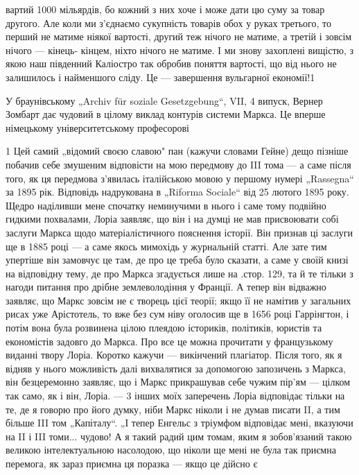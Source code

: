 \parcont{}  %
вартий 1000 мільярдів, бо кожний з них хоче і може дати цю суму за товар другого. Але коли ми з'єднаємо сукупність товарів
обох у руках третього, то перший не матиме ніякої вартості, другий теж нічого не матиме, а третій і зовсім нічого — кінець-
кінцем, ніхто нічого не матиме. І ми знову захоплені вищістю, з якою наш південний Каліостро так обробив поняття вартості,
що від нього не залишилось і найменшого сліду. Це — завершення вульгарної економії!1

У браунівському „Archiv für soziale Gesetzgebung“, VII, 4 випуск, Вернер Зомбарт дає чудовий в цілому виклад контурів
системи Маркса. Це вперше німецькому університетському професорові

1 Цей самий „відомий своєю славою" пан (кажучи словами Гейне) дещо пізніше побачив себе змушеним відповісти на мою передмову
до III тома — а саме після того, як ця передмова з’явилась італійською мовою у першому нумері „Rassegna“ за 1895 рік.
Відповідь надрукована в „Riforma Sociale“ від 25 лютого 1895 року. Щедро наділивши мене спочатку неминучими в нього і саме
тому подвійно гидкими похвалами, Лоріа заявляє, що він і на думці не мав присвоювати собі заслуги Маркса щодо
матеріалістичного пояснення історії. Він признав ці заслуги ще в 1885 році — а саме якось мимохідь у журнальній статті. Але
зате тим упертіше він замовчує це там, де про це треба було сказати, а саме у своїй книзі на відповідну тему, де про Маркса
згадується лише на .стор. 129, та й те тільки з нагоди питання про дрібне землеволодіння у Франції. А тепер він відважно
заявляє, що Маркс зовсім не є творець цієї теорії; якщо її не намітив у загальних рисах уже Арістотель, то вже без сум ніву
оголосив ще в 1656 році Гаррінгтон, і потім вона була розвинена цілою плеядою істориків, політиків, юристів та економістів
задовго до Маркса. Про все це можна прочитати у французькому виданні твору Лоріа. Коротко кажучи — викінчений плагіатор.
Після того, як я відняв у нього можливість далі вихвалятися за допомогою запозичень з Маркса, він безцеремонно заявляє, що і
Маркс прикрашував себе чужим пір’ям — цілком так само, як і він, Лоріа. — 3 інших моїх заперечень Лоріа відповідає тільки на
те, де я говорю про його думку, ніби Маркс ніколи і не думав писати II, а тим більше III том „Капіталу“. „І тепер Енгельс з
тріумфом відповідає мені, вказуючи на II і III томи... чудово! А я такий радий цим томам, яким я зобов’язаний такою великою
інтелектуальною насолодою, що ніколи ще мені не була так приємна перемога, як зараз приємна ця поразка — якщо це дійсно є
